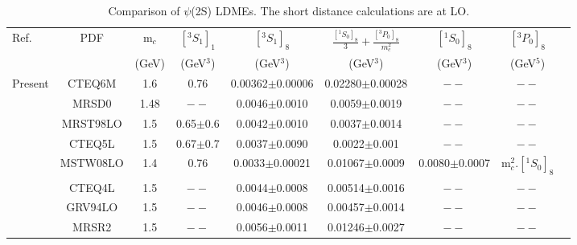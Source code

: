 \documentclass[aps,prc,preprint,superscriptaddress,showpacs,showkeys,amsmath]{revtex4-1}
\begin{document}
\begin{enumerate}
{\begin{table}[h]
\caption{Comparison of $\psi$(2S) LDMEs. The short distance calculations are at LO. }
\begin{tabular}{|l|c|c|c|c|c|c|c|c|}
\hline            
Ref.                             &PDF     &m$_{c}$  &$[^3S_1]_{1}$    &$[^3S_1]_{8}$        &$\frac{[^1S_{0}]_{8}}{3}+\frac{[^3P_0]_{8}}{m_{c}^2}$ &$[^1S_0]_{8}$   &$[^3P_0]_{8}$\\
                                &        &(GeV)   &(GeV$^3$)       &(GeV$^3$)           &(GeV$^3$)                                         &(GeV$^3$)      &(GeV$^5$)\\ 
\hline
Present                         &CTEQ6M   &1.6     &0.76           &0.00362$\pm$0.00006 &0.02280$\pm$0.00028                               &$--$            &$--$ \\
\cite{Cho:1995vh}               &MRSD0    &1.48    &$--$           &0.0046$\pm$0.0010   &0.0059$\pm$0.0019                                 &$--$            &$--$ \\
\cite{Braaten:1999qk}           &MRST98LO &1.5     &0.65$\pm$0.6   &0.0042$\pm$0.0010   &0.0037$\pm$0.0014                                 &$--$            &$--$ \\
\cite{Braaten:1999qk}           &CTEQ5L   &1.5     &0.67$\pm$0.7   &0.0037$\pm$0.0090   &0.0022$\pm$0.001                                  &$--$            &$--$ \\
\cite{Sharma:2012dy}            &MSTW08LO &1.4     &0.76           &0.0033$\pm$0.00021  &0.01067$\pm$0.0009                                &0.0080$\pm$0.0007&m$_{c}^{2}$.$[^1S_0]_{8}$\\
\cite{Beneke:1996yw}            &CTEQ4L   &1.5     &$--$           &0.0044$\pm$0.0008   &0.00514$\pm$0.0016                                &$--$            &$--$ \\
\cite{Beneke:1996yw}            &GRV94LO  &1.5     &$--$           &0.0046$\pm$0.0008   &0.00457$\pm$0.0014                                &$--$            &$--$ \\
\cite{Beneke:1996yw}            &MRSR2    &1.5     &$--$           &0.0056$\pm$0.0011   &0.01246$\pm$0.0027                                &$--$            &$--$ \\
\hline
\end{tabular}
\label{table:LDMEPsi2S}
\end{table}





}
\end{enumerate}
\end{document}
